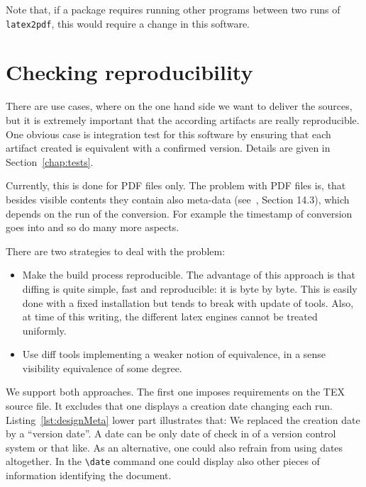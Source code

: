 Note that, if a package requires running other programs 
between two runs of \texttt{latex2pdf}, 
this would require a change in this software. 

\section{Checking reproducibility}\label{sec:chkReprod}

There are use cases, where on the one hand side we want to deliver the sources, 
but it is extremely important that the according artifacts are really reproducible. 
One obvious case is integration test for this software 
by ensuring that each artifact created 
is equivalent with a confirmed version. 
Details are given in Section~\ref{chap:tests}. 



Currently, this is done for PDF files only. 
The problem with PDF files is, that besides visible contents 
they contain also meta-data (see~\cite{pdf17}, Section 14.3), 
which depends on the run of the conversion. 
For example the timestamp of conversion goes into and so do many more aspects. 

There are two strategies to deal with the problem: 
%
\begin{itemize}
  \item 
  Make the build process reproducible. 
  The advantage of this approach is that diffing is quite simple, fast and reproducible: 
  it is byte by byte. 
  This is easily done with a fixed installation but tends to break with update of tools. 
  Also, at time of this writing, the different latex engines cannot be treated uniformly. 
  \item 
  Use diff tools implementing a weaker notion of equivalence, 
  in a sense visibility equivalence of some degree. 
\end{itemize}

We support both approaches. 
The first one imposes requirements on the TEX source file. 
It excludes that one displays a creation date changing each run. 
Listing~\ref{lst:designMeta} lower part illustrates that: 
We replaced the creation date by a ``version date''. 
A date can be only date of check in of a version control system or that like. 
As an alternative, one could also refrain from using dates altogether. 
In the \texttt{\textbackslash date} command 
one could display also other pieces of information identifying the document. 

